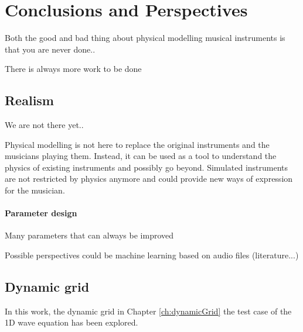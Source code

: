\chapter{Conclusions and Perspectives}\label{ch:conclusion}
Both the good and bad thing about physical modelling musical instruments is that you are never done..

There is always more work to be done


\section{Realism}
We are not there yet.. 

Physical modelling is not here to replace the original instruments and the musicians playing them. Instead, it can be used as a tool to understand the physics of existing instruments and possibly go beyond. Simulated instruments are not restricted by physics anymore and could provide new ways of expression for the musician. 

\subsubsection{Parameter design}
Many parameters that can always be improved

Possible perspectives could be machine learning based on audio files (literature...)

\section{Dynamic grid}
In this work, the dynamic grid in Chapter \ref{ch:dynamicGrid} the test case of the 1D wave equation has been explored. 
